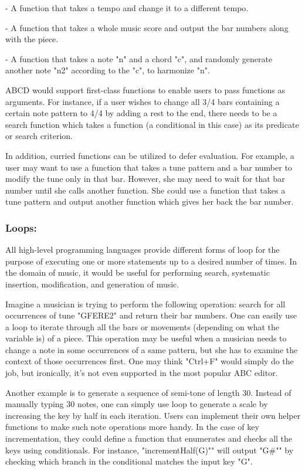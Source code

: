    - A function that takes a tempo and change it to a different tempo.

    - A function that takes a whole music score and output the bar numbers along with the piece.
    
    - A function that takes a note "n" and a chord "c", and randomly generate another note "n2" according to the "c", to harmonize "n".
      
    ABCD would support first-class functions to enable users to pass functions as arguments. For instance, if a user wishes to change all 3/4 bars containing a certain note pattern to 4/4 by adding a rest to the end, there needs to be a search function which takes a function (a conditional in this case) as its predicate or search criterion.

     In addition, curried functions can be utilized to defer evaluation. For example, a user may want to use a function that takes a tune pattern and a bar number to modify the tune only in that bar. However, she may need to wait for that bar number until she calls another function. She could use a function that takes a tune pattern and output another function which gives her back the bar number.  

    \subsubsection{Loops:}
    All high-level programming languages provide different forms of loop for the purpose of executing one or more statements up to a desired number of times. In the domain of music, it would be useful for performing search, systematic insertion, modification, and generation of music. 

    Imagine a musician is trying to perform the following operation: search for all occurrences of tune "GFERE2" and return their bar numbers. One can easily use a loop to iterate through all the bars or movements (depending on what the variable is) of a piece. This operation may be useful when a musician needs to change a note in some occurrences of a same pattern, but she has to examine the context of those occurrences first. One may think "Ctrl+F" would simply do the job, but ironically, it's not even supported in the most popular ABC editor\cite{SlashdotMedia17}.  

    Another example is to generate a sequence of semi-tone of length 30. Instead of manually typing 30 notes, one can simply use loop to generate a scale by increasing the key by half in each iteration. Users can implement their own helper functions to make such note operations more handy. In the case of key incrementation, they could define a function that enumerates and checks all the keys using conditionals. For instance, "incrementHalf(G)"" will output "G\#"" by checking which branch in the conditional matches the input key "G".

